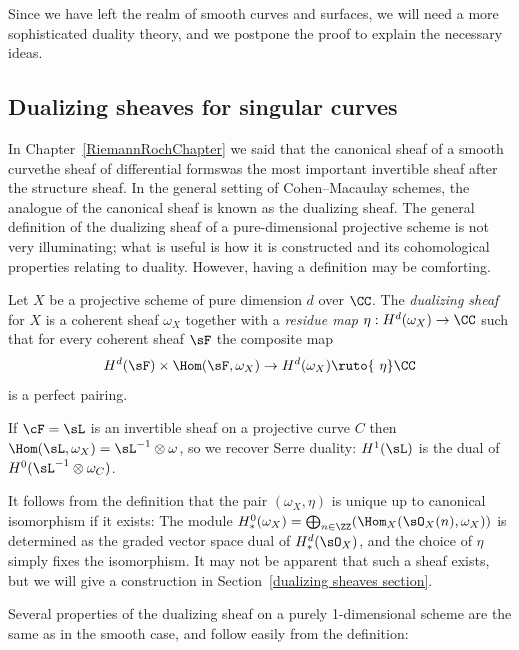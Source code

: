 Since we have left the realm of smooth curves and surfaces, we will need
a more sophisticated
duality theory,
%
and we
postpone the proof to explain the necessary ideas.

\subsection*{Dualizing sheaves for singular curves}

In Chapter~\ref{RiemannRochChapter} we said that the
canonical sheaf of a smooth curve\emdash the sheaf of differential
forms\emdash was the most important invertible sheaf after the
structure sheaf. In the general setting of Cohen--Macaulay schemes,
the analogue of the canonical sheaf is
known as
the dualizing sheaf.
The general definition of
the dualizing sheaf of a pure-dimensional projective scheme
is not very illuminating;
what is useful is how it is constructed and its cohomological properties
relating to duality.
However, having a definition may be comforting.

\begin{definition}
Let $X$ be a projective scheme  of pure dimension $d$ over $\CC$. The
%
\emph{dualizing sheaf} for $X$ is a coherent sheaf $\omega_X$
\label{dualizing sheaf for singular curve}
together
with a \emph{residue map} $\eta: H^d(\omega_X) \to\nobreak \CC$ such that for
%
every coherent sheaf  $\sF$ the composite map
$$
H^d(\sF) \times \Hom(\sF, \omega_X) \to H^d(\omega_X) \ruto {\ \eta} \CC
$$
is a
perfect pairing.
%
\unif
\end{definition}

If $\cF = \sL$ is an invertible sheaf on a projective curve $C$
then $\Hom(\sL, \omega_X) = \sL^{-1}\otimes \omega$,
so
we recover
Serre duality:
%
$H^{1}(\sL)$ is the dual of
$H^{0}(\sL^{-1}\otimes \omega_{C})$.

It follows from the definition that the pair $(\omega_{X}, \eta)$ is
unique up to canonical isomorphism if it exists:
The module $H^{0}_{*}(\omega_{X}) = \bigoplus_{n\in \ZZ}(\Hom_{X}(\sO_{X}(n),
\omega_{X}))$
is determined as the graded vector space dual of $H^{d}_{*}(\sO_{X})$,
and the choice of $\eta$ simply fixes the isomorphism. It may not be
apparent that such a sheaf exists, but we will give a construction in
Section~\ref{dualizing sheaves section}.

Several properties of the dualizing sheaf on a purely 1-dimensional
scheme
are the same as in the smooth case, and follow easily from the definition:

